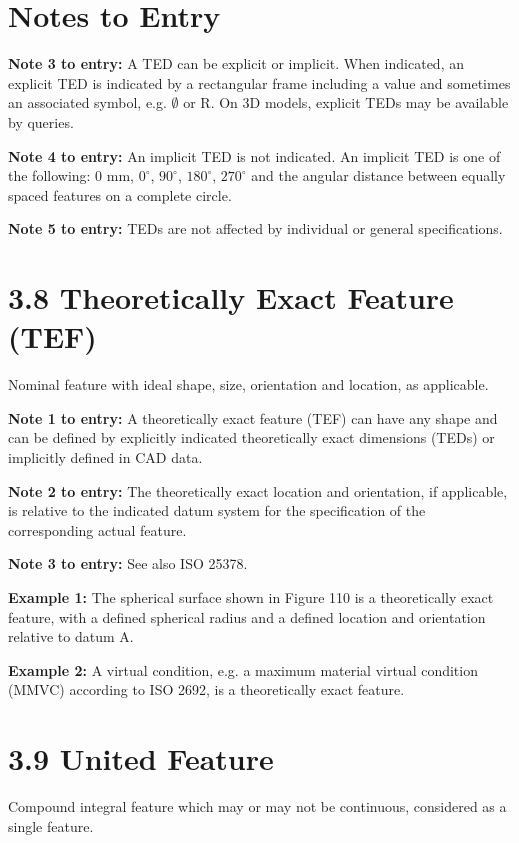 \documentclass[a4paper,12pt]{article}
\begin{document}
\section*{Notes to Entry}

\textbf{Note 3 to entry:} A TED can be explicit or implicit. When indicated, an explicit TED is indicated by a rectangular frame including a value and sometimes an associated symbol, e.g. $\emptyset$ or R. On 3D models, explicit TEDs may be available by queries.

\textbf{Note 4 to entry:} An implicit TED is not indicated. An implicit TED is one of the following: 0 mm, $0^\circ$, $90^\circ$, $180^\circ$, $270^\circ$ and the angular distance between equally spaced features on a complete circle.

\textbf{Note 5 to entry:} TEDs are not affected by individual or general specifications.

\section*{3.8 Theoretically Exact Feature (TEF)}

Nominal feature with ideal shape, size, orientation and location, as applicable.

\textbf{Note 1 to entry:} A theoretically exact feature (TEF) can have any shape and can be defined by explicitly indicated theoretically exact dimensions (TEDs) or implicitly defined in CAD data.

\textbf{Note 2 to entry:} The theoretically exact location and orientation, if applicable, is relative to the indicated datum system for the specification of the corresponding actual feature.

\textbf{Note 3 to entry:} See also ISO 25378.

\textbf{Example 1:} The spherical surface shown in Figure 110 is a theoretically exact feature, with a defined spherical radius and a defined location and orientation relative to datum A.

\textbf{Example 2:} A virtual condition, e.g. a maximum material virtual condition (MMVC) according to ISO 2692, is a theoretically exact feature.

\section*{3.9 United Feature}

Compound integral feature which may or may not be continuous, considered as a single feature.
\end{document}
